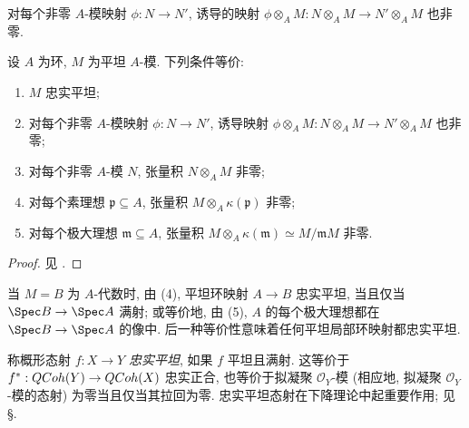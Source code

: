 对每个非零 $A$-模映射 $\phi:N\to N'$, 诱导的映射 $\phi\otimes_A M:N\otimes_A M\to N'\otimes_A M$ 也非零.
\begin{proposition}[忠实平坦性的等价条件]\label{src:A.2.19}
设 $A$ 为环, $M$ 为平坦 $A$-模. 下列条件等价:
\begin{enumerate}[(1)]
\item $M$ 忠实平坦;
\item 对每个非零 $A$-模映射 $\phi:N\to N'$, 诱导映射 $\phi\otimes_A M:N\otimes_A M\to N'\otimes_A M$ 也非零;
\item 对每个非零 $A$-模 $N$, 张量积 $N\otimes_A M$ 非零;
\item 对每个素理想 $\mathfrak p\subseteq A$, 张量积 $M\otimes_A\kappa(\mathfrak p)$ 非零;
\item 对每个极大理想 $\mathfrak m\subseteq A$, 张量积 $M\otimes_A\kappa(\mathfrak m)\simeq M/\mathfrak m M$ 非零.
\end{enumerate}
\end{proposition}
\begin{proof}
见 \cite[Tag 00H9]{SP}.
\end{proof}
当 $M=B$ 为 $A$-代数时, 由 (4), 平坦环映射 $A\to B$ 忠实平坦, 当且仅当 $\Spec B\to\Spec A$ 满射; 或等价地, 由 (5), $A$ 的每个极大理想都在 $\Spec B\to\Spec A$ 的像中. 后一种等价性意味着任何平坦局部环映射都忠实平坦.

称概形态射 $f:X\to Y$ \textit{忠实平坦}, 如果 $f$ 平坦且满射. 这等价于 $f^*:QCoh(Y)\to QCoh(X)$ 忠实正合, 也等价于拟凝聚 $\mathcal O_Y$-模 (相应地, 拟凝聚 $\mathcal O_Y$-模的态射) 为零当且仅当其拉回为零. 忠实平坦态射在下降理论中起重要作用; 见 \S{}.

